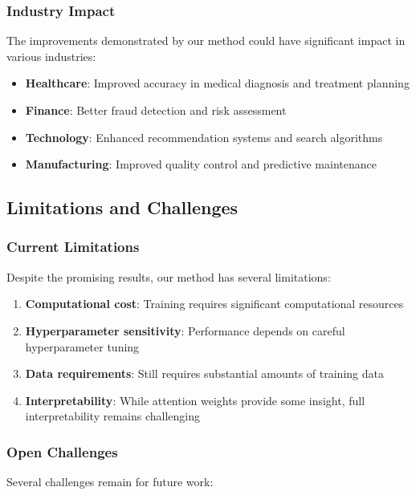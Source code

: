 \subsubsection{Industry Impact}

The improvements demonstrated by our method could have significant impact in various industries:

\begin{itemize}
    \item \textbf{Healthcare}: Improved accuracy in medical diagnosis and treatment planning
    \item \textbf{Finance}: Better fraud detection and risk assessment
    \item \textbf{Technology}: Enhanced recommendation systems and search algorithms
    \item \textbf{Manufacturing}: Improved quality control and predictive maintenance
\end{itemize}

\subsection{Limitations and Challenges}

\subsubsection{Current Limitations}

Despite the promising results, our method has several limitations:

\begin{enumerate}
    \item \textbf{Computational cost}: Training requires significant computational resources
    \item \textbf{Hyperparameter sensitivity}: Performance depends on careful hyperparameter tuning
    \item \textbf{Data requirements}: Still requires substantial amounts of training data
    \item \textbf{Interpretability}: While attention weights provide some insight, full interpretability remains challenging
\end{enumerate}

\subsubsection{Open Challenges}

Several challenges remain for future work:

